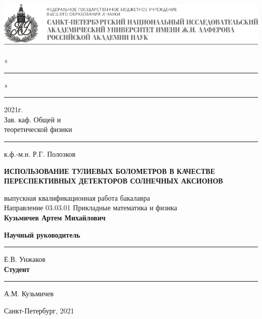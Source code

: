 
\begin{titlepage}


\vspace{15mm}
\begin{center}
    \includegraphics[width = \textwidth]{images/autitle.png}
\end{center}

\vspace{0.1mm}

\begin{flushright}
    «\rule{1cm}{0.15mm}» \rule{2cm}{0.15mm} 2021г. \\
    Зав. каф. Общей и \\
    теоретической физики \\
    \rule{25mm}{0.20mm} к.ф.-м.н. Р.Г. Полозков \\
\end{flushright}


\begin{center}

\vspace{9mm}
\textbf{\large ИСПОЛЬЗОВАНИЕ ТУЛИЕВЫХ БОЛОМЕТРОВ В КАЧЕСТВЕ ПЕРЕСПЕКТИВНЫХ ДЕТЕКТОРОВ СОЛНЕЧНЫХ АКСИОНОВ}
\vspace{9mm}

выпускная квалификационная работа бакалавра \\
\vspace{10mm}
Направление 03.03.01 Прикладные математика и физика \\
\vspace{14mm}
\textbf{\large Кузьмичев Артем Михайлович}


\vspace{16mm}

\textbf{Научный руководитель} \hfill \rule{6.5cm}{0.15mm} Е.В. Унжаков \\
\vspace{5mm}
\textbf{Студент} \hfill  \rule{6cm}{0.15mm} А.М. Кузьмичев

\vfill 

{Санкт-Петербург, 2021}
\end{center}
\end{titlepage}
\restoregeometry
\addtocounter{page}{1}